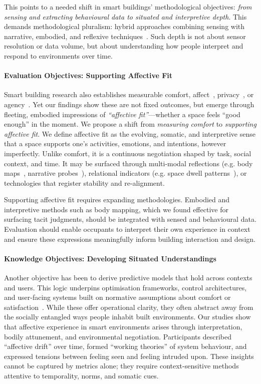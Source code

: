 This points to a needed shift in smart buildings' methodological objectives: \textit{from sensing and extracting behavioural data to situated and interpretive depth}. This demands methodological pluralism: hybrid approaches combining sensing with narrative, embodied, and reflexive techniques~\cite{moran2013using, bower2019impact}. Such depth is not about sensor resolution or data volume, but about understanding how people interpret and respond to environments over time.

\paragraph{Evaluation Objectives: Supporting Affective Fit}
Smart building research also establishes measurable comfort, affect~\cite{bower2019impact, moran2013using}, privacy~\cite{schnadelbach2019adaptive}, or agency~\cite{mitchell2020no}. Yet our findings show these are not fixed outcomes, but emerge through fleeting, embodied impressions of \textit{``affective fit''}---whether a space feels “good enough” in the moment. We propose a shift from \textit{measuring comfort} to \textit{supporting affective fit}. We define affective fit as the evolving, somatic, and interpretive sense that a space supports one’s activities, emotions, and intentions, however imperfectly. Unlike comfort, it is a continuous negotiation shaped by task, social context, and time. It may be surfaced through multi-modal reflections (e.g. body maps~\cite{turmo2023towards}, narrative probes~\cite{gaver2004cultural}), relational indicators (e.g. space dwell patterns~\cite{verma2017studying}), or technologies that register stability and re-alignment.

Supporting affective fit requires expanding methodologies. Embodied and interpretive methods such as body mapping, which we found effective for surfacing tacit judgments, should be integrated with sensed and behavioural data. Evaluation should enable occupants to interpret their own experience in context and ensure these expressions meaningfully inform building interaction and design.

\paragraph{Knowledge Objectives: Developing Situated Understandings}

Another objective has been to derive predictive models that hold across contexts and users. This logic underpins optimisation frameworks, control architectures, and user-facing systems built on normative assumptions about comfort or satisfaction~\cite{becerik2022ten}. While these offer operational clarity, they often abstract away from the socially entangled ways people inhabit built environments. Our studies show that affective experience in smart environments arises through interpretation, bodily attunement, and environmental negotiation. Participants described ``affective drift'' over time, formed ``working theories'' of system behaviour, and expressed tensions between feeling seen and feeling intruded upon. These insights cannot be captured by metrics alone; they require context-sensitive methods attentive to temporality, norms, and somatic cues.

